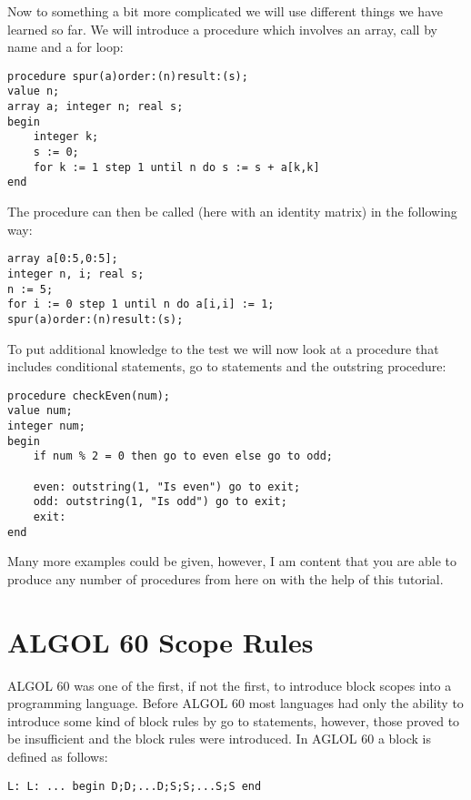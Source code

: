\documentclass{article}
\begin{document}
Now to something a bit more complicated we will use different things we have learned so far. We will introduce a procedure which involves an array, call by name and a for loop:

\begin{lstlisting}[language={[60]algol}]
procedure spur(a)order:(n)result:(s);
value n;
array a; integer n; real s;
begin
    integer k;
    s := 0;
    for k := 1 step 1 until n do s := s + a[k,k]
end
\end{lstlisting}

The procedure can then be called (here with an identity matrix) in the following way:

\begin{lstlisting}[language={[60]algol}]
array a[0:5,0:5];
integer n, i; real s;
n := 5;
for i := 0 step 1 until n do a[i,i] := 1;
spur(a)order:(n)result:(s);
\end{lstlisting}

To put additional knowledge to the test we will now look at a procedure that includes conditional statements, go to statements and the outstring procedure:

\begin{lstlisting}[language={[60]algol}]
procedure checkEven(num);
value num;
integer num;
begin
    if num % 2 = 0 then go to even else go to odd;
    
    even: outstring(1, "Is even") go to exit;
    odd: outstring(1, "Is odd") go to exit;
    exit:
end
\end{lstlisting}

Many more examples could be given, however, I am content that you are able to produce any number of procedures from here on with the help of this tutorial.

\newpage

\section{ALGOL 60 Scope Rules} \label{scopeRule}
ALGOL 60 was one of the first, if not the first, to introduce block scopes into a programming language. Before ALGOL 60 most languages had only the ability to introduce some kind of block rules by go to statements, however, those proved to be insufficient and the block rules were introduced. In AGLOL 60 a block is defined as follows:

\begin{lstlisting}[language={[60]algol}]
L: L: ... begin D;D;...D;S;S;...S;S end
\end{lstlisting}
\end{document}
